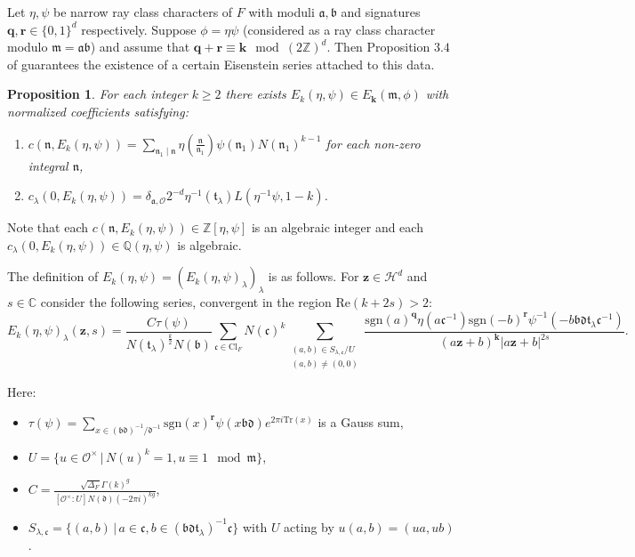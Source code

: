 \documentclass[a4paper,oneside]{amsart}
\theoremstyle{plain}
\newtheorem{prop}[thm]{Proposition}
\theoremstyle{definition}
\begin{document}
Let $\eta,\psi$ be narrow ray class characters of $F$ with moduli $\mathfrak{a},\mathfrak{b}$ and signatures $\textbf{q},\textbf{r}\in\{0,1\}^d$ respectively. Suppose $\phi = \eta\psi$ (considered as a ray class character modulo $\mathfrak{m} = \mathfrak{a}\mathfrak{b}$) and assume that $\textbf{q}+\textbf{r} \equiv \textbf{k} \mod (2\mathbb{Z})^d$. Then Proposition $3.4$ of \cite{shimura} guarantees the existence of a certain Eisenstein series attached to this data.

\begin{prop}
For each integer $k \ge 2$ there exists $E_{k}(\eta,\psi)\in E_{\textbf{k}}(\mathfrak{m},\phi)$ with normalized coefficients satisfying:
\begin{enumerate}
\item{$c(\mathfrak{n},E_{k}(\eta,\psi)) = \sum_{\mathfrak{n}_1\mid\mathfrak{n}}\eta(\frac{\mathfrak{n}}{\mathfrak{n}_1})\psi(\mathfrak{n_1})N(\mathfrak{n}_1)^{k-1}$ for each non-zero integral $\mathfrak{n}$,}
\item{$c_\lambda(0,E_k(\eta,\psi)) = \delta_{\mathfrak{a},\mathcal{O}}2^{-d}\eta^{-1}(\mathfrak{t}_{\lambda})L(\eta^{-1}\psi,1-k)$.}
\end{enumerate}
\end{prop}

Note that each $c(\mathfrak{n},E_k(\eta,\psi))\in \mathbb{Z}[\eta,\psi]$ is an algebraic integer and each $c_{\lambda}(0,E_k(\eta,\psi))\in\mathbb{Q}(\eta,\psi)$ is algebraic. 

The definition of $E_k(\eta,\psi) = (E_k(\eta,\psi)_{\lambda})_\lambda$ is as follows. For $\textbf{z}\in\mathcal{H}^d$ and $s\in \mathbb{C}$ consider the following series, convergent in the region $\text{Re}(k+2s)>2$: \[E_k(\eta,\psi)_{\lambda}(\textbf{z},s) = \frac{C\tau(\psi)}{N(\mathfrak{t}_{\lambda})^{\frac{k}{2}}N(\mathfrak{b})}\sum_{\mathfrak{c}\in\text{Cl}_F}N(\mathfrak{c})^k\sum_{\substack{(a,b)\in S_{\lambda,\mathfrak{c}}/U \\ (a,b) \ne (0,0)}}\frac{\text{sgn}(a)^{\textbf{q}}\eta(a\mathfrak{c}^{-1})\text{sgn}(-b)^{\textbf{r}}\psi^{-1}(-b\mathfrak{bdt}_{\lambda}\mathfrak{c}^{-1})}{(a\textbf{z}+b)^{\textbf{k}} |a\textbf{z}+b|^{2s}}.\]

Here:

\begin{itemize}
\item{$\tau(\psi) = \sum_{x \in (\mathfrak{bd})^{-1}/\mathfrak{d}^{-1}}\text{sgn}(x)^{\textbf{r}}\psi(x\mathfrak{bd})e^{2\pi i \text{Tr}(x)}$ is a Gauss sum,}
\item{$U = \{u\in\mathcal{O}^{\times}\,|\,N(u)^k = 1, u \equiv 1 \mod \mathfrak{m}\}$,}
\item{$C = \frac{\sqrt{\Delta_F}\Gamma(k)^g}{[\mathcal{O}^{\times}:U]N(\mathfrak{d})(-2\pi i)^{kg}}$,}
\item{$S_{\lambda,\mathfrak{c}} = \{(a,b)\,|\,a\in\mathfrak{c}, b\in (\mathfrak{bdt}_{\lambda})^{-1}\mathfrak{c}\}$ with $U$ acting by $u(a,b) = (ua,ub)$.}
\end{itemize}
\end{document}
